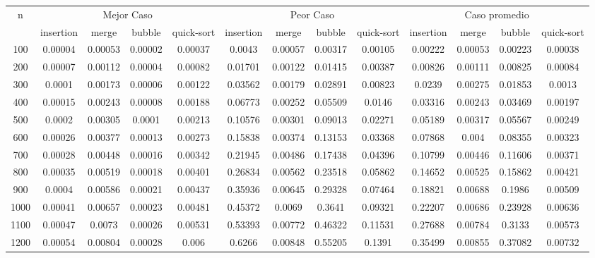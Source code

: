\documentclass[conference]{IEEEtran}
\begin{document}
\begin{table}[!ht]
\begin{tabular}{|c|c|c|c|c|c|c|c|c|c|c|c|c|}
\hline
\multirow{2}{*}{n} & \multicolumn{4}{c|}{Mejor Caso} & \multicolumn{4}{c|}{Peor Caso} & \multicolumn{4}{c|}{Caso promedio} \\ 
\cline{2-13}
& insertion & merge & bubble & quick-sort & insertion & merge & bubble & quick-sort & insertion & merge & bubble & quick-sort \\ 
\hline
100 & 0.00004 & 0.00053 & 0.00002 & 0.00037 & 0.0043 & 0.00057 & 0.00317 & 0.00105 &0.00222 & 0.00053 & 0.00223 & 0.00038 \\
\hline
200 & 0.00007 & 0.00112 & 0.00004 & 0.00082 & 0.01701 & 0.00122 & 0.01415 & 0.00387 &0.00826 & 0.00111 & 0.00825 & 0.00084 \\
\hline
300 & 0.0001 & 0.00173 & 0.00006 & 0.00122 & 0.03562 & 0.00179 & 0.02891 & 0.00823 &0.0239 & 0.00275 & 0.01853 & 0.0013 \\
\hline
400 & 0.00015 & 0.00243 & 0.00008 & 0.00188 & 0.06773 & 0.00252 & 0.05509 & 0.0146 &0.03316 & 0.00243 & 0.03469 & 0.00197 \\
\hline
500 & 0.0002 & 0.00305 & 0.0001 & 0.00213 & 0.10576 & 0.00301 & 0.09013 & 0.02271 &0.05189 & 0.00317 & 0.05567 & 0.00249 \\
\hline
600 & 0.00026 & 0.00377 & 0.00013 & 0.00273 & 0.15838 & 0.00374 & 0.13153 & 0.03368 &0.07868 & 0.004 & 0.08355 & 0.00323 \\
\hline
700 & 0.00028 & 0.00448 & 0.00016 & 0.00342 & 0.21945 & 0.00486 & 0.17438 & 0.04396 &0.10799 & 0.00446 & 0.11606 & 0.00371 \\
\hline
800 & 0.00035 & 0.00519 & 0.00018 & 0.00401 & 0.26834 & 0.00562 & 0.23518 & 0.05862 &0.14652 & 0.00525 & 0.15862 & 0.00421 \\
\hline
900 & 0.0004 & 0.00586 & 0.00021 & 0.00437 & 0.35936 & 0.00645 & 0.29328 & 0.07464 &0.18821 & 0.00688 & 0.1986 & 0.00509 \\
\hline
1000 & 0.00041 & 0.00657 & 0.00023 & 0.00481 & 0.45372 & 0.0069 & 0.3641 & 0.09321 &0.22207 & 0.00686 & 0.23928 & 0.00636 \\
\hline
1100 & 0.00047 & 0.0073 & 0.00026 & 0.00531 & 0.53393 & 0.00772 & 0.46322 & 0.11531 &0.27688 & 0.00784 & 0.3133 & 0.00573 \\
\hline
1200 & 0.00054 & 0.00804 & 0.00028 & 0.006 & 0.6266 & 0.00848 & 0.55205 & 0.1391 &0.35499 & 0.00855 & 0.37082 & 0.00732 \\

\end{tabular}
\end{table}
\end{document}

